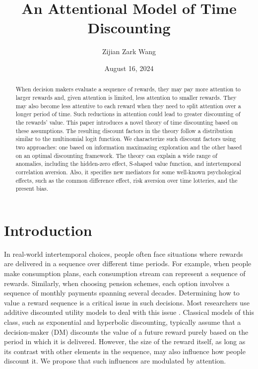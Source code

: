 \documentclass[
  12pt,
]{article}
\title{An Attentional Model of Time Discounting}
\author{Zijian Zark Wang}
\date{August 16, 2024}
\begin{document}
\maketitle
\begin{abstract}
When decision makers evaluate a sequence of rewards, they may pay more
attention to larger rewards and, given attention is limited, less
attention to smaller rewards. They may also become less attentive to
each reward when they need to split attention over a longer period of
time. Such reductions in attention could lead to greater discounting of
the rewards' value. This paper introduces a novel theory of time
discounting based on these assumptions. The resulting discount factors
in the theory follow a distribution similar to the multinomial logit
function. We characterize such discount factors using two approaches:
one based on information maximazing exploration and the other based on
an optimal discounting framework. The theory can explain a wide range of
anomalies, including the hidden-zero effect, S-shaped value function,
and intertemporal correlation aversion. Also, it specifies new mediators
for some well-known psychological effects, such as the common difference
effect, risk aversion over time lotteries, and the present bias.
\end{abstract}

\hypertarget{introduction}{%
\section{Introduction}\label{introduction}}

In real-world intertemporal choices, people often face situations where
rewards are delivered in a sequence over different time periods. For
example, when people make consumption plans, each consumption stream can
represent a sequence of rewards. Similarly, when choosing pension
schemes, each option involves a sequence of monthly payments spanning
several decades. Determining how to value a reward sequence is a
critical issue in such decisions. Most researchers use additive
discounted utility models to deal with this issue
\citep[see][]{cohen2020measuring}. Classical models of this class, such
as exponential and hyperbolic discounting, typically assume that a
decision-maker (DM) discounts the value of a future reward purely based
on the period in which it is delivered. However, the size of the reward
itself, as long as its contrast with other elements in the sequence, may
also influence how people discount it. We propose that such influences
are modulated by attention.
\end{document}
